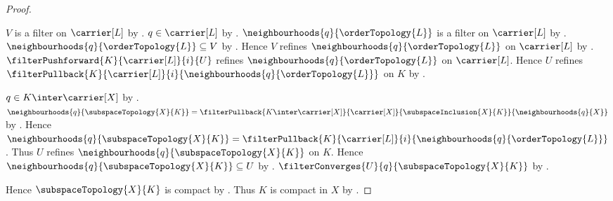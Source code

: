\begin{proof}
\begin{subproof}
        $V$ is a filter on $\carrier[L]$ by
            .
        $q\in\carrier[L]$ by .
        $\neighbourhoods{q}{\orderTopology{L}}$ is a filter on
            $\carrier[L]$ by
            .
        $\neighbourhoods{q}{\orderTopology{L}}\subseteq V$ by
            .
        Hence $V$ refines $\neighbourhoods{q}{\orderTopology{L}}$ on
            $\carrier[L]$ by .
        $\filterPushforward{K}{\carrier[L]}{i}{U}$ refines
            $\neighbourhoods{q}{\orderTopology{L}}$ on $\carrier[L]$.
        Hence $U$ refines
            $\filterPullback{K}{\carrier[L]}{i}{
                \neighbourhoods{q}{\orderTopology{L}}}$ on $K$ by
            .

        $q\in K\inter\carrier[X]$ by
            .
        $\neighbourhoods{q}{\subspaceTopology{X}{K}}
            =\filterPullback{K\inter\carrier[X]}{\carrier[X]}{
                \subspaceInclusion{X}{K}}{\neighbourhoods{q}{X}}$ by
            .
        Hence $\neighbourhoods{q}{\subspaceTopology{X}{K}}
            =\filterPullback{K}{\carrier[L]}{i}{
                \neighbourhoods{q}{\orderTopology{L}}}$.
        Thus $U$ refines
            $\neighbourhoods{q}{\subspaceTopology{X}{K}}$ on $K$.
        Hence $\neighbourhoods{q}{\subspaceTopology{X}{K}}\subseteq U$
            by .
        $\filterConverges{U}{q}{\subspaceTopology{X}{K}}$ by
            .
    \end{subproof}
    Hence $\subspaceTopology{X}{K}$ is compact by
        .
    Thus $K$ is compact in $X$ by .
\end{proof}
